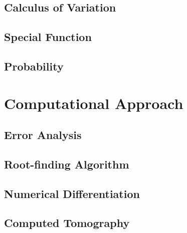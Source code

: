 \documentclass[10pt]{report}
\begin{document}
\section{Calculus of Variation}

\clearpage

\clearpage

\section{Special Function}

\clearpage

\section{Probability}

\clearpage

\chapter{Computational Approach}
\clearpage
\section{Error Analysis}

\clearpage

\section{Root-finding Algorithm}

\clearpage

\section{Numerical Differentiation}

\clearpage

\section{Computed Tomography}

\printbibliography
\end{document}
